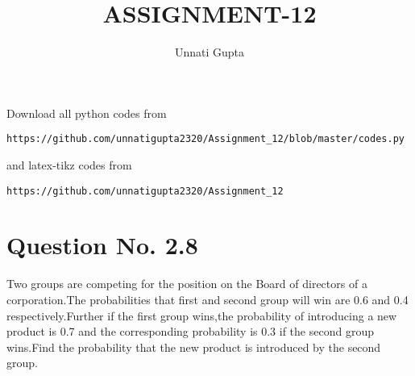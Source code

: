 \documentclass[journal,12pt,twocolumn]{IEEEtran}
\begin{document}
     \def\centbox#1{\makebox[0in]{#1}}
     \def\topbox#1{\raisebox{-\baselineskip}[0in][0in]{#1}}
     \def\midbox#1{\raisebox{-0.5\baselineskip}[0in][0in]{#1}}
\vspace{3cm}
\title{ASSIGNMENT-12}
\author{Unnati Gupta}
\maketitle
\newpage
\bigskip
\renewcommand{\thefigure}{\theenumi}
\renewcommand{\thetable}{\theenumi}
Download all python codes from 
\begin{lstlisting}
https://github.com/unnatigupta2320/Assignment_12/blob/master/codes.py
\end{lstlisting}
%
and latex-tikz codes from 
%
\begin{lstlisting}
https://github.com/unnatigupta2320/Assignment_12
\end{lstlisting}
%
\section{Question No. 2.8}
Two groups are competing for the position on the Board of directors of a corporation.The probabilities that first and second group will win are 0.6 and 0.4 respectively.Further if the first group wins,the probability of introducing a new product is 0.7 and the corresponding probability is 0.3 if the second group wins.Find the probability that the new product is introduced by the second group. 
\end{document}
